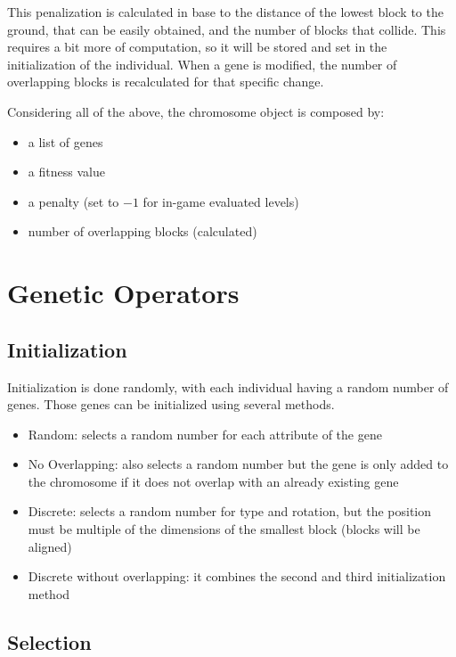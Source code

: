 This penalization is calculated in base to the distance of the lowest block to the ground, that can be easily obtained, and the number of blocks that collide. This requires a bit more of computation, so it will be stored and set in the initialization of the individual. When a gene is modified, the number of overlapping blocks is recalculated for that specific change. 

Considering all of the above, the chromosome object is composed by:
\begin{itemize}
	\item a list of genes
	\item a fitness value
	\item a penalty (set to $-1$ for in-game evaluated levels)
	\item number of overlapping blocks (calculated) 
\end{itemize}

\section{Genetic Operators}

\subsection{Initialization}\label{ga:init}

Initialization is done randomly, with each individual having a random number of genes. Those genes can be initialized using several methods. 

\begin{itemize}
	\item Random: selects a random number for each attribute of the gene
	\item No Overlapping: also selects a random number but the gene is only added to the chromosome if it does not overlap with an already existing gene
	\item Discrete: selects a random number for type and rotation, but the position must be multiple of the dimensions of the smallest block (blocks will be aligned)
	\item Discrete without overlapping: it combines the second and third initialization method
\end{itemize}

\subsection{Selection}\label{ga:select}

